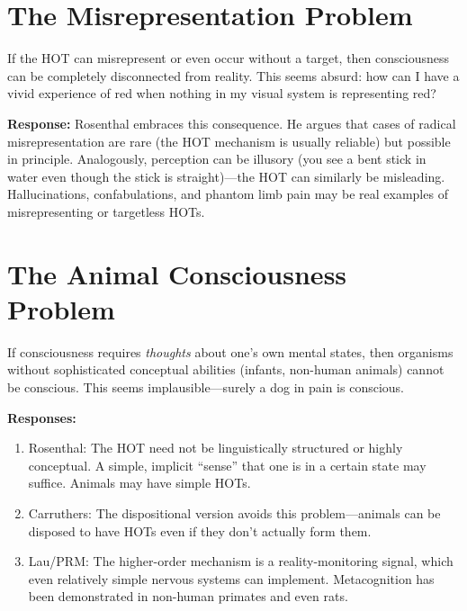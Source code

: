 \documentclass[11pt,a4paper]{report}
\begin{document}
\section{The Misrepresentation Problem}

\begin{objbox}
If the HOT can misrepresent or even occur without a target, then consciousness can be completely disconnected from reality. This seems absurd: how can I have a vivid experience of red when nothing in my visual system is representing red?
\end{objbox}

\textbf{Response:} Rosenthal embraces this consequence. He argues that cases of radical misrepresentation are rare (the HOT mechanism is usually reliable) but possible in principle. Analogously, perception can be illusory (you see a bent stick in water even though the stick is straight)---the HOT can similarly be misleading. Hallucinations, confabulations, and phantom limb pain may be real examples of misrepresenting or targetless HOTs.

\section{The Animal Consciousness Problem}

\begin{objbox}
If consciousness requires \emph{thoughts} about one's own mental states, then organisms without sophisticated conceptual abilities (infants, non-human animals) cannot be conscious. This seems implausible---surely a dog in pain is conscious.
\end{objbox}

\textbf{Responses:}
\begin{enumerate}[leftmargin=2em]
  \item Rosenthal: The HOT need not be linguistically structured or highly conceptual. A simple, implicit ``sense'' that one is in a certain state may suffice. Animals may have simple HOTs.
  \item Carruthers: The dispositional version avoids this problem---animals can be disposed to have HOTs even if they don't actually form them.
  \item Lau/PRM: The higher-order mechanism is a reality-monitoring signal, which even relatively simple nervous systems can implement. Metacognition has been demonstrated in non-human primates and even rats.
\end{enumerate}
\end{document}
